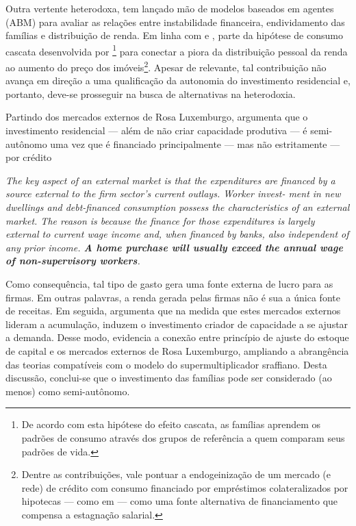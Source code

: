 Outra vertente heterodoxa, tem lançado mão de modelos baseados em agentes (ABM) para avaliar as relações entre instabilidade financeira, endividamento das famílias e distribuição de renda.
Em linha com \textcite{cynamon_inequality_2013} e \textcite{erlingsson_integrating_2013}, \textcite{cardaci_inequality_2018} parte da hipótese de consumo cascata desenvolvida por \textcite{frank_expenditure_2014}\footnote{
	De acordo com esta hipótese do efeito cascata, as famílias aprendem os padrões de consumo através dos grupos de referência a quem comparam seus padrões de vida.
} para conectar a piora da distribuição pessoal da renda ao aumento do preço dos imóveis\footnote{Dentre as contribuições, vale pontuar a endogeinização de um mercado (e rede) de crédito com consumo financiado por empréstimos colateralizados por hipotecas --- como em \textcite{mian_house_2011} --- como uma fonte alternativa de financiamento que compensa a estagnação salarial.}.
Apesar de relevante, tal contribuição não avança em direção a uma qualificação da autonomia do investimento residencial e, portanto, deve-se prosseguir na busca de alternativas na heterodoxia.

Partindo dos mercados externos de Rosa Luxemburgo, \textcite{fiebiger_semi-autonomous_2018} argumenta que o investimento residencial --- além de não criar capacidade produtiva --- é semi-autônomo uma vez que é financiado principalmente --- mas não estritamente --- por crédito

\begin{citacao}
	\textit{The key aspect of an external market is that the expenditures
		are financed by a source external to the firm sector’s current outlays. Worker invest-
		ment in new dwellings and debt-financed consumption possess the characteristics of
		an external market. The reason is because the finance for those expenditures is largely
		external to current wage income and, when financed by banks, also independent of any
		prior income. \textbf{A home purchase will usually exceed the annual wage of non-supervisory
			workers}.
	}
	\cite[p.~3, grifos adicionados]{fiebiger_semi-autonomous_2018}
\end{citacao}
Como consequência, tal tipo de gasto gera uma fonte externa de lucro para as firmas.
Em outras palavras, a renda gerada pelas firmas não é sua a única fonte de receitas.
Em seguida, argumenta que na medida que estes mercados externos lideram a acumulação, induzem o investimento criador de capacidade a se ajustar a demanda.
Desse modo, \textcite{fiebiger_semi-autonomous_2018} evidencia a conexão entre princípio de ajuste do estoque de capital e os mercados externos de Rosa Luxemburgo, ampliando a abrangência das teorias compatíveis com o modelo do supermultiplicador sraffiano.
Desta discussão, conclui-se que o investimento das famílias pode ser considerado (ao menos) como semi-autônomo. 

